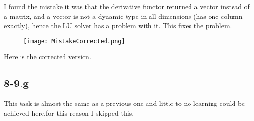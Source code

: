 \documentclass{article}
\begin{document}
I found the mistake it was that the derivative functor returned a vector instead of a matrix, and a vector is not a dynamic type in all dimensions (has one column exactly), hence the LU solver has a problem with it. This fixes the problem.

\begin{figure}[!hbt]
    \centering
    \texttt{[image: MistakeCorrected.png]}
\end{figure}

Here is the corrected version. 

\subsection*{8-9.g} 
This task is almost the same as a previous one and little to no learning could be achieved here,for this reason I skipped this.
\end{document}
